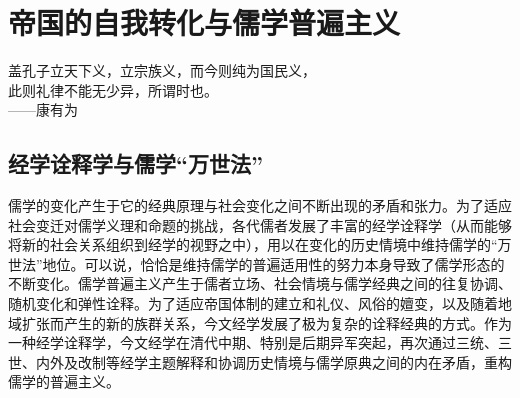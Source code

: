 \documentclass[a4paper, 12pt, openright]{ctexbook}
\renewenvironment{quote}
  {\list{}{\rightmargin2\ccwd \leftmargin2\ccwd \itemindent=2\ccwd \listparindent=2\ccwd}%
   \item\relax\small\kaishu\color{black}}
  {\endlist}
\begin{document}
\chapter{帝国的自我转化与儒学普遍主义}

\begin{quote}
盖孔子立天下义，立宗族义，而今则纯为国民义，\\
此则礼律不能无少异，所谓时也。\\
\hspace*{0pt}\hfill ——康有为
\end{quote}

\section{经学诠释学与儒学“万世法”}

儒学的变化产生于它的经典原理与社会变化之间不断出现的矛盾和张力。为了适应社会变迁对儒学义理和命题的挑战，各代儒者发展了丰富的经学诠释学（从而能够将新的社会关系组织到经学的视野之中），用以在变化的历史情境中维持儒学的“万世法”地位。可以说，恰恰是维持儒学的普遍适用性的努力本身导致了儒学形态的不断变化。儒学普遍主义产生于儒者立场、社会情境与儒学经典之间的往复协调、随机变化和弹性诠释。为了适应帝国体制的建立和礼仪、风俗的嬗变，以及随着地域扩张而产生的新的族群关系，今文经学发展了极为复杂的诠释经典的方式。作为一种经学诠释学，今文经学在清代中期、特别是后期异军突起，再次通过三统、三世、内外及改制等经学主题解释和协调历史情境与儒学原典之间的内在矛盾，重构儒学的普遍主义。
\end{document}
